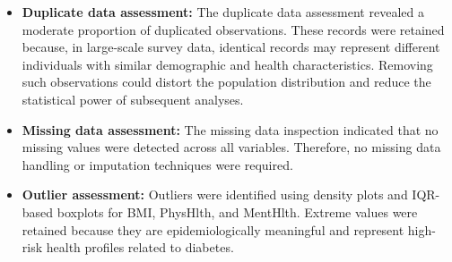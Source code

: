 \begin{itemize}
    \item \textbf{Duplicate data assessment:} The duplicate data assessment revealed a moderate proportion of duplicated observations. These records were retained because, in large-scale survey data, identical records may represent different individuals with similar demographic and health characteristics. Removing such observations could distort the population distribution and reduce the statistical power of subsequent analyses.
    
    \item \textbf{Missing data assessment:} The missing data inspection indicated that no missing values were detected across all variables. Therefore, no missing data handling or imputation techniques were required.
    
    \item \textbf{Outlier assessment:} Outliers were identified using density plots and IQR-based boxplots for BMI, PhysHlth, and MentHlth. Extreme values were retained because they are epidemiologically meaningful and represent high-risk health profiles related to diabetes.
\end{itemize}


